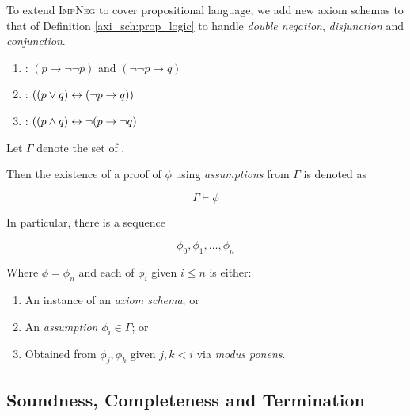 \begin{definition}
    \label{axi_sch:prop_logic}
    To extend \textsc{ImpNeg} to cover propositional language, we add new axiom
    schemas to that of Definition \ref{axi_sch:prop_logic} to handle
    \textit{double negation}, \textit{disjunction} and \textit{conjunction}.
    
    \begin{enumerate}
        \item {}: $(p \to \neg \neg p)$ and $(\neg \neg p \to q)$
        \item {}: $((p \lor q) \leftrightarrow (\neg p \to q))$
        \item {}: $((p \land q) \leftrightarrow \neg(p \to \neg q)$
    \end{enumerate}
\end{definition}

\begin{definition}
    Let $\Gamma$ denote the set of .
    
    Then the existence of a proof of $\phi$ using \textit{assumptions} from 
    $\Gamma$ is denoted as
    
    \begin{equation}
        \Gamma \vdash \phi
    \end{equation}
    
    In particular, there is a sequence
    
    \begin{equation}
        \phi_0, \phi_1, \ldots, \phi_n    
    \end{equation}
    
    Where $\phi = \phi_n$ and each of $\phi_i$ given $i \le n$ is either:
    
    \begin{enumerate}
        \item An instance of an \textit{axiom schema}; or
        \item An \textit{assumption} $\phi_i \in \Gamma$; or
        \item Obtained from $\phi_j, \phi_k$ given $j, k < i$ via 
            \textit{modus ponens}.
    \end{enumerate}
\end{definition}

\subsection{Soundness, Completeness and Termination}

